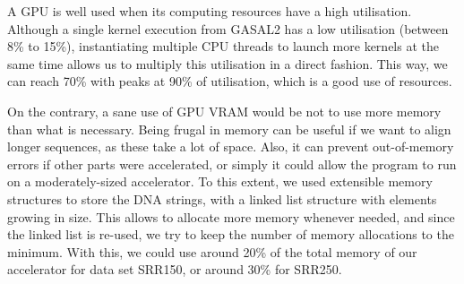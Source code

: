 A GPU is well used when its computing resources have a high utilisation. Although a single kernel execution from GASAL2 has a low utilisation (between 8\% to 15\%), instantiating multiple CPU threads to launch more kernels at the same time allows us to multiply this utilisation in a direct fashion. This way, we can reach 70\% with peaks at 90\% of utilisation, which is a good use of resources.

On the contrary, a sane use of GPU VRAM would be not to use more memory than what is necessary. Being frugal in memory can be useful if we want to align longer sequences, as these take a lot of space. Also, it can prevent out-of-memory errors if other parts were accelerated, or simply it could allow the program to run on a moderately-sized accelerator. To this extent, we used extensible memory structures to store the DNA strings, with a linked list structure with elements growing in size. This allows to allocate more memory whenever needed, and since the linked list is re-used, we try to keep the number of memory allocations to the minimum. With this, we could use around 20\% of the total memory of our accelerator for data set SRR150, or around 30\% for SRR250. 

